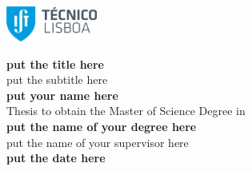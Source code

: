 \documentclass[10pt,a4paper]{report}
\begin{document}
\pagestyle{plain}

\thispagestyle {empty}

\includegraphics[width=3.0cm]{Figures/Logo.png}

\begin{center}
	
	{\FontSn \textbf{put the title here}} \\
	{\FontSn put the subtitle here} \\
	\vspace{0.7cm}
	{\FontSn \textbf{put your name here}} \\
	\vspace{0.7cm}
	{\FontSn Thesis to obtain the Master of Science Degree in} \\
	{\FontSn \textbf{put the name of your degree here}} \\
	\vspace{0.7cm}
	{\FontSm %
		put the name of your supervisor here \\
	}
	\vspace{0.1cm}
	{\FontSm \textbf{put the date here}} \\
\end{center}

\cleardoublepage

\restoregeometry
\end{document}
